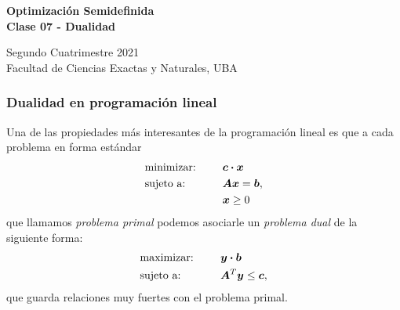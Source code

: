 \documentclass[aspectratio=169,12pt,spanish]{beamer}
\begin{document}

\begin{frame}

 \begin{center}

\Large\textbf{Optimización Semidefinida} \\
\large\textbf{Clase 07 - Dualidad}




\vspace{1cm}
 Segundo Cuatrimestre 2021
 \\
 {\small Facultad de Ciencias Exactas y Naturales, UBA}
 \end{center}

\end{frame}




\begin{frame}
\frametitle{Dualidad en programación lineal}

Una de las propiedades m\'as interesantes de la programaci\'on lineal es que a cada problema en forma estándar
\begin{alignat*}{2}
  & \text{minimizar: } & & \bm{c} \boldsymbol{\cdot} \bm{x}  \\
   & \text{sujeto a: } & \quad & \bm{A} \bm{x} = \bm{b}, \\
   &&& \bm{x} \ge 0
\end{alignat*}
que llamamos \emph{problema primal} podemos asociarle un \emph{problema dual} de la siguiente forma:
\begin{alignat*}{2}
  & \text{maximizar: } & & \bm{y} \boldsymbol{\cdot} \bm{b}  \\
   & \text{sujeto a: } & \quad & \bm{A}^T \bm{y} \le \bm{c},
\end{alignat*}
que guarda relaciones muy fuertes con el problema primal.

\end{frame}
\end{document}
